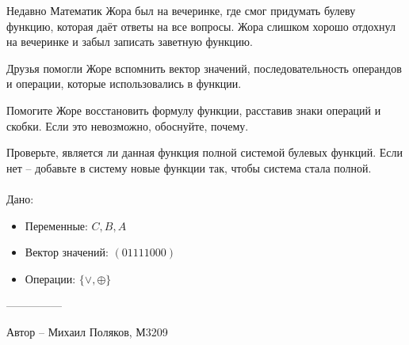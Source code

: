 \question
Недавно Математик Жора был на вечеринке, где смог придумать булеву функцию, которая даёт ответы на все вопросы. Жора слишком хорошо отдохнул на вечеринке и забыл записать заветную функцию.

Друзья помогли Жоре вспомнить вектор значений, последовательность операндов и операции, которые использовались в функции.

Помогите Жоре восстановить формулу функции, расставив знаки операций и скобки. Если это невозможно, обоснуйте, почему.

Проверьте, является ли данная функция полной системой булевых функций. Если нет -- добавьте в систему новые функции так, чтобы система стала полной.
\\
\\
Дано:
\begin{itemize}
\item Переменные: $C, B, A$
\item Вектор значений: $(01111000)$
\item Операции: $\{\lor, \oplus\}$
\end{itemize}

---------------

Автор -- Михаил Поляков, М3209